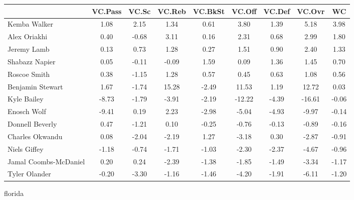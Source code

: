 \documentclass[10pt,letterpaper]{article}
\begin{document}
\begin{table}[ht]
\begin{center}
\begin{tabular}{lcccccccc}
  \hline
 & VC.Pass & VC.Sc & VC.Reb & VC.BkSt & VC.Off & VC.Def & VC.Ovr & WC \\ 
  \hline
Kemba Walker & 1.08 & 2.15 & 1.34 & 0.61 & 3.80 & 1.39 & 5.18 & 3.98 \\ 
  Alex Oriakhi & 0.40 & -0.68 & 3.11 & 0.16 & 2.31 & 0.68 & 2.99 & 1.80 \\ 
  Jeremy Lamb & 0.13 & 0.73 & 1.28 & 0.27 & 1.51 & 0.90 & 2.40 & 1.33 \\ 
  Shabazz Napier & 0.05 & -0.11 & -0.09 & 1.59 & 0.09 & 1.36 & 1.45 & 0.70 \\ 
  Roscoe Smith & 0.38 & -1.15 & 1.28 & 0.57 & 0.45 & 0.63 & 1.08 & 0.56 \\ 
  Benjamin Stewart & 1.67 & -1.74 & 15.28 & -2.49 & 11.53 & 1.19 & 12.72 & 0.03 \\ 
  Kyle Bailey & -8.73 & -1.79 & -3.91 & -2.19 & -12.22 & -4.39 & -16.61 & -0.06 \\ 
  Enosch Wolf & -9.41 & 0.19 & 2.23 & -2.98 & -5.04 & -4.93 & -9.97 & -0.14 \\ 
  Donnell Beverly & 0.47 & -1.21 & 0.10 & -0.25 & -0.76 & -0.13 & -0.89 & -0.16 \\ 
  Charles Okwandu & 0.08 & -2.04 & -2.19 & 1.27 & -3.18 & 0.30 & -2.87 & -0.91 \\ 
  Niels Giffey & -1.18 & -0.74 & -1.71 & -1.03 & -2.30 & -2.37 & -4.67 & -0.96 \\ 
  Jamal Coombs-McDaniel & 0.20 & 0.24 & -2.39 & -1.38 & -1.85 & -1.49 & -3.34 & -1.17 \\ 
  Tyler Olander & -0.20 & -3.30 & -1.16 & -1.46 & -4.20 & -1.91 & -6.11 & -1.20 \\ 
   \hline
\end{tabular}
\end{center}
\end{table}
\newpage
\begin{center}
florida 
\end{center}
\end{document}
